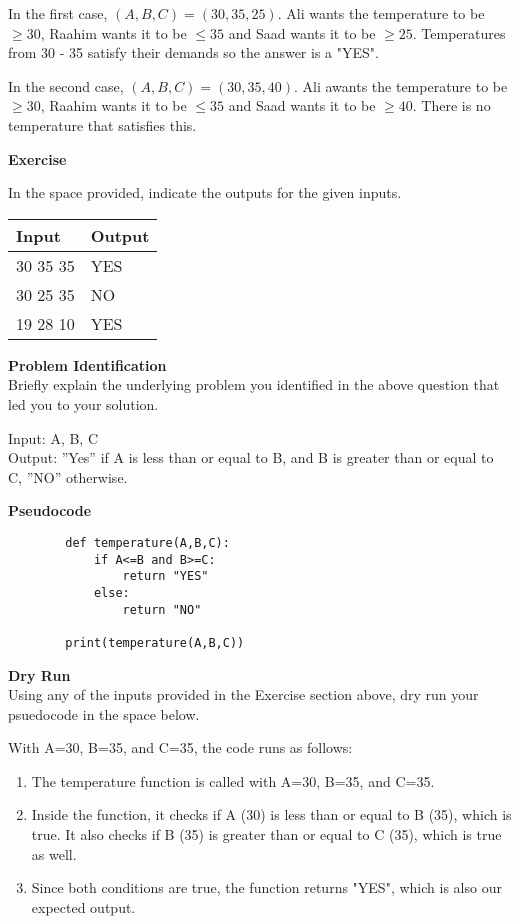 \documentclass[a4paper]{exam}
\newcommand\heading[1]{\textbf{#1}}
\begin{document}
\begin{questions}
    In the first case, $(A,B,C)=(30,35,25)$. Ali wants the temperature to be $ \geq 30$, Raahim wants it to be $ \leq 35$ and Saad wants it to be $ \geq 25$. Temperatures from 30 - 35 satisfy their demands so the answer is a "YES".

    In the second case, $(A,B,C)=(30,35,40)$. Ali awants the temperature to be $ \geq 30$, Raahim wants it to be $ \leq 35$ and Saad wants it to be $ \geq 40$. There is no temperature that satisfies this.

    \heading{Exercise}

    In the space provided, indicate the outputs for the given inputs.

    \begin{tabularx}{\textwidth}{|X|X|}
        \rowcolor{gray!50}
        \hline
        Input    & Output \\ \hline\hline
        30 35 35 &    YES    \\\hline
        30 25 35 &    NO    \\\hline
        19 28 10 &    YES    \\\hline
    \end{tabularx}


    \heading{Problem Identification}\\
    Briefly explain the underlying problem you identified in the above question that led you to your solution.


   Input: A, B, C \\
   Output: ''Yes” if A is less than or equal to B, and B is greater than or equal to C,  ”NO” otherwise.

    \heading{Pseudocode}
    \begin{verbatim}
        def temperature(A,B,C):
            if A<=B and B>=C:
                return "YES"
            else:
                return "NO"
            
        print(temperature(A,B,C))
    \end{verbatim}

 

    \heading{Dry Run}\\
    Using any of the inputs provided in the Exercise section above, dry run your psuedocode in the space below.

With A=30, B=35, and C=35, the code runs as follows:

\begin{enumerate}
   \item The temperature function is called with A=30, B=35, and C=35.
    \item Inside the function, it checks if A (30) is less than or equal to B (35), which is true. It also checks if B (35) is greater than or equal to C (35), which is true as well.
    \item Since both conditions are true, the function returns "YES", which is also our expected output.
    

\end{enumerate}
\end{questions}
\end{document}

